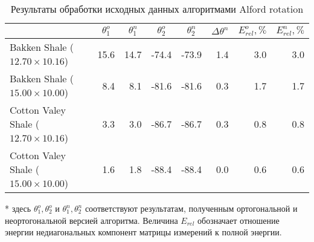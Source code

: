\documentclass[a4paper,11pt]{article}
\begin{document}
\begin{table}[h]
\footnotesize
\caption{Результаты обработки исходных данных алгоритмами Alford rotation}
\renewcommand{\arraystretch}{1.5}
\begin{tabularx}{\textwidth}{|X|rr|rr|r|rr|}
\hline	
				&\multicolumn{1}{c}{$\theta_1^o$} & \multicolumn{1}{c|}{$\theta_1^n$} & \multicolumn{1}{c}{$\theta_2^o$} & \multicolumn{1}{c|}{$\theta_2^n$} & \multicolumn{1}{c|}{$\Delta\theta^n$}& \multicolumn{1}{c}{$E_{rel}^o, \%$} & \multicolumn{1}{c|}{$E_{rel}^n, \%$} \\ \hline
\hline Bakken Shale ($12.70 \times 10.16$) & 15.6 & 14.7 & -74.4 & -73.9  & 1.4  & 3.0 & 3.0 \\
\hline Bakken Shale ($15.00 \times 10.00$) & 8.4 & 8.1 & -81.6 & -81.6 & 0.3 & 1.7 & 1.7 \\
\hline Cotton Valey Shale ($12.70 \times 10.16$) & 3.3 & 3.0 & -86.7 & -86.7  & 0.3 & 0.8 & 0.8 \\ 
\hline Cotton Valey Shale ($15.00 \times 10.00$) & 1.6 & 1.8 & -88.4 & -88.4  & 0.0  & 0.6 & 0.6 \\	   
 	   \hline
\end{tabularx} 
\begin{flushleft}
* здесь $\theta_1^o,\theta_2^o$ и $\theta_1^n,\theta_2^n$ соответствуют результатам, полученным ортогональной и неортогональной версией алгоритма. Величина $E_{rel}$ обозначает отношение энергии недиагональных компонент матрицы измерений к полной энергии.
\end{flushleft}
\label{tab:std_process_results}
\renewcommand{\arraystretch}{1.0}
\end{table}
\end{document}

